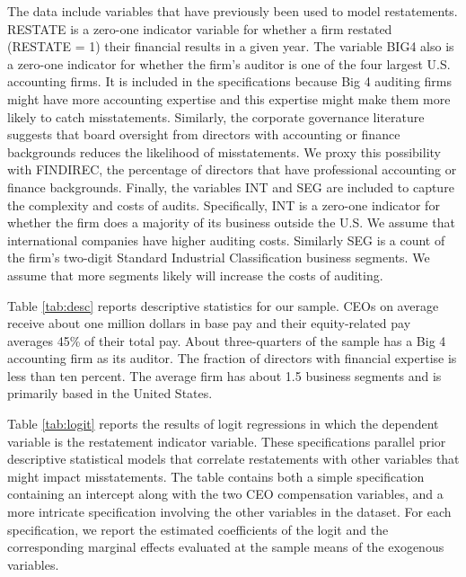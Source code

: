 The data include variables that have previously been used to model restatements. 
RESTATE is a zero-one indicator variable for whether a firm restated (RESTATE = 1) their financial results in a given year.  
The variable BIG4 also is a zero-one indicator for whether the firm's auditor is one of the four largest U.S. accounting firms. 
It is included in the specifications because Big 4 auditing firms might have more accounting expertise and this expertise might make them more likely to catch misstatements. 
Similarly, the corporate governance literature suggests that board oversight from directors with accounting or finance backgrounds reduces the likelihood of misstatements. We proxy this possibility with FINDIREC, the percentage of directors that have professional accounting or finance backgrounds.
Finally, the variables INT and SEG are included to capture the complexity and costs of audits. 
Specifically, INT is a zero-one indicator for whether the firm does a majority of its business outside the U.S.
We assume that international companies have higher auditing costs. 
Similarly SEG is a count of the firm's two-digit Standard Industrial Classification business segments. 
We assume that more segments likely will increase the costs of auditing. 

Table \ref{tab:desc} reports descriptive statistics for our sample. 
CEOs on average receive about one million dollars in base pay and their equity-related pay averages 45\% of their total pay.
About three-quarters of the sample has a Big 4 accounting firm as its auditor. 
The fraction of directors with financial expertise is less than ten percent. 
The average firm has about 1.5 business segments and is primarily based in the United States.

Table \ref{tab:logit} reports the results of logit regressions in which the dependent variable is the restatement indicator variable.
These specifications parallel prior descriptive statistical models that correlate restatements with other variables that might impact misstatements.
The table contains both a simple specification containing an intercept along with the two CEO  compensation variables, and a more intricate specification involving the other variables in the dataset.
For each specification, we report the estimated coefficients of the logit and the corresponding marginal effects evaluated at the sample means of the exogenous variables.

